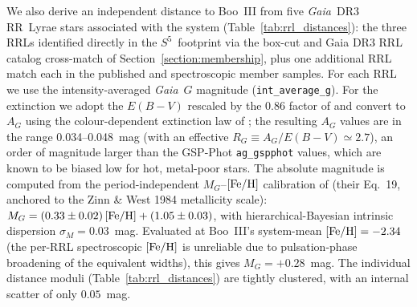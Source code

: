 \documentclass[twocolumn, apj, numberedappendix, appendixfloats]{openjournal_dhayaa}
\newcommand{\SSSSS}{${S}^5$\xspace}
\newcommand{\gaia}{\textit{Gaia}\xspace}
\begin{document}
We also derive an independent distance to Boo~III from five \gaia~DR3 RR~Lyrae stars associated with the system (Table~\ref{tab:rrl_distances}): the three RRLs identified directly in the \SSSSS\ footprint via the box-cut and Gaia DR3 RRL catalog cross-match of Section~\ref{section:membership}, plus one additional RRL match each in the published \citet{Carlin2018} and \citet{Geha2026} spectroscopic member samples. For each RRL we use the intensity-averaged \gaia~$G$ magnitude (\texttt{int\_average\_g}). For the extinction we adopt the \citet{Schlegel1998} $E(B-V)$ rescaled by the $0.86$ factor of \citet{Schlafly2011} and convert to $A_G$ using the colour-dependent extinction law of \citet{Babusiaux2018}; the resulting $A_G$ values are in the range 0.034--0.048~mag (with an effective $R_G \equiv A_G/E(B-V)\simeq 2.7$), an order of magnitude larger than the GSP-Phot \texttt{ag\_gspphot} values, which are known to be biased low for hot, metal-poor stars. The absolute magnitude is computed from the period-independent $M_G$--$[{\rm Fe/H}]$ calibration of \citet{Garofalo2022} (their Eq.~19, anchored to the Zinn \& West 1984 metallicity scale): $M_G = (0.33 \pm 0.02)\,[{\rm Fe/H}] + (1.05 \pm 0.03)$, with hierarchical-Bayesian intrinsic dispersion $\sigma_M = 0.03$~mag. Evaluated at Boo~III's system-mean $[{\rm Fe/H}] = -2.34$ (the per-RRL spectroscopic $[{\rm Fe/H}]$ is unreliable due to pulsation-phase broadening of the equivalent widths), this gives $M_G = +0.28$~mag. The individual distance moduli (Table~\ref{tab:rrl_distances}) are tightly clustered, with an internal scatter of only $0.05$~mag.
\end{document}
